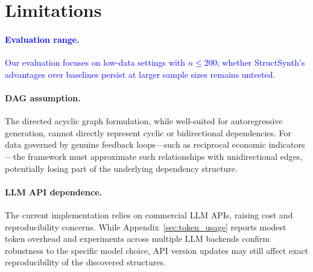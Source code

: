 \section*{Limitations}

\paragraph{\textcolor{blue}{Evaluation range.}}
\textcolor{blue}{Our evaluation focuses on low-data settings with $n\leq 200$; whether \textsf{StructSynth}'s advantages over baselines persist at larger sample sizes remains untested.}

\paragraph{DAG assumption.}
The directed acyclic graph formulation, while well-suited for autoregressive generation, cannot directly represent cyclic or bidirectional dependencies.
For data governed by genuine feedback loops---such as reciprocal economic indicators---the framework must approximate such relationships with unidirectional edges, potentially losing part of the underlying dependency structure.

\paragraph{LLM API dependence.}
The current implementation relies on commercial LLM APIs, raising cost and reproducibility concerns.
While Appendix~\ref{sec:token_usage} reports modest token overhead and experiments across multiple LLM backends confirm robustness to the specific model choice, API version updates may still affect exact reproducibility of the discovered structures.

